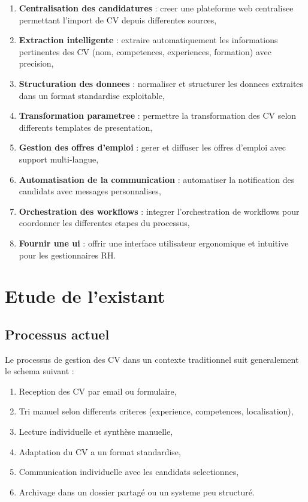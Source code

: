 \begin{enumerate}
    \item \textbf{Centralisation des candidatures} : creer une plateforme web centralisee permettant l'import de CV depuis differentes sources,
    
    \item \textbf{Extraction intelligente} : extraire automatiquement les informations pertinentes des CV (nom, competences, experiences, formation) avec precision,
    
    \item \textbf{Structuration des donnees} : normaliser et structurer les donnees extraites dans un format standardise exploitable,
    
    \item \textbf{Transformation parametree} : permettre la transformation des CV selon differents templates de presentation,
    
    \item \textbf{Gestion des offres d'emploi} : gerer et diffuser les offres d'emploi avec support multi-langue,
    
    \item \textbf{Automatisation de la communication} : automatiser la notification des candidats avec messages personnalises,
    
    \item \textbf{Orchestration des workflows} : integrer l'orchestration de workflows pour coordonner les differentes etapes du processus,
    
    \item \textbf{Fournir une \acrfull{ui}} : offrir une interface utilisateur ergonomique et intuitive pour les gestionnaires RH.
\end{enumerate}

\section{Etude de l'existant}

\subsection{Processus actuel}

Le processus de gestion des CV dans un contexte traditionnel suit generalement le schema suivant :

\begin{enumerate}
    \item Reception des CV par email ou formulaire,
    \item Tri manuel selon differents criteres (experience, competences, localisation),
    \item Lecture individuelle et synthèse manuelle,
    \item Adaptation du CV a un format standardise,
    \item Communication individuelle avec les candidats selectionnes,
    \item Archivage dans un dossier partagé ou un systeme peu structuré.
\end{enumerate}


